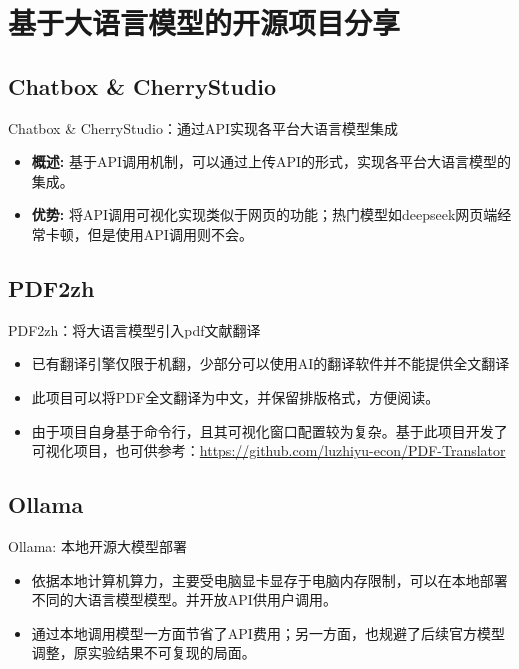 \documentclass{beamer}
\begin{document}
\section{基于大语言模型的开源项目分享}
\subsection{Chatbox \& CherryStudio}
\begin{frame}{Chatbox \& CherryStudio：通过API实现各平台大语言模型集成}
  \begin{itemize}
    \item \textbf{概述:} 基于API调用机制，可以通过上传API的形式，实现各平台大语言模型的集成。
    \item \textbf{优势:} 将API调用可视化实现类似于网页的功能；热门模型如deepseek网页端经常卡顿，但是使用API调用则不会。
  \end{itemize}
\end{frame}

\subsection{PDF2zh}
\begin{frame}{PDF2zh：将大语言模型引入pdf文献翻译}
  \begin{itemize}
    \item 已有翻译引擎仅限于机翻，少部分可以使用AI的翻译软件并不能提供全文翻译
    \item 此项目可以将PDF全文翻译为中文，并保留排版格式，方便阅读。
    \item 由于项目自身基于命令行，且其可视化窗口配置较为复杂。基于此项目开发了可视化项目，也可供参考：\url{https://github.com/luzhiyu-econ/PDF-Translator}
  \end{itemize}
\end{frame}

\subsection{Ollama}
\begin{frame}{Ollama: 本地开源大模型部署}
  \begin{itemize}
    \item 依据本地计算机算力，主要受电脑显卡显存于电脑内存限制，可以在本地部署不同的大语言模型模型。并开放API供用户调用。
    \item 通过本地调用模型一方面节省了API费用；另一方面，也规避了后续官方模型调整，原实验结果不可复现的局面。
  \end{itemize}
\end{frame}
\end{document}
